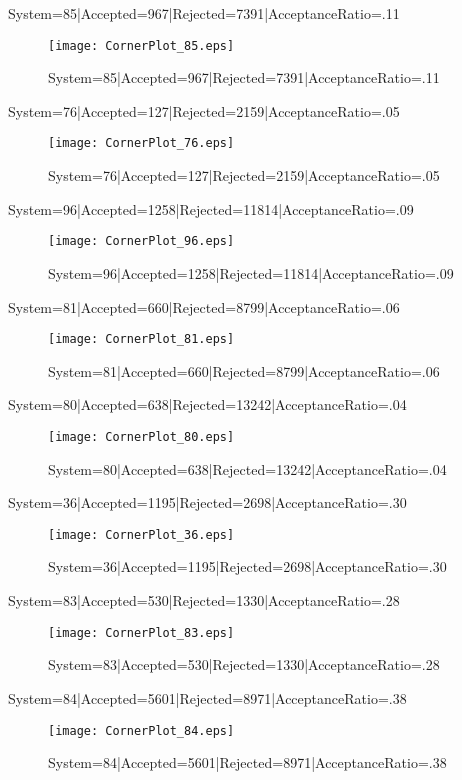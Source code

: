 \documentclass[10pt]{article}
\begin{document}
\listoffigures
System=85|Accepted=967|Rejected=7391|AcceptanceRatio=.11
\begin{figure}[h]
\texttt{[image: CornerPlot\_85.eps]}
\caption{System=85|Accepted=967|Rejected=7391|AcceptanceRatio=.11}
\label{S85}
\centering
\end{figure}

System=76|Accepted=127|Rejected=2159|AcceptanceRatio=.05
\begin{figure}[h]
\texttt{[image: CornerPlot\_76.eps]}
\caption{System=76|Accepted=127|Rejected=2159|AcceptanceRatio=.05}
\label{S76}
\centering
\end{figure}

System=96|Accepted=1258|Rejected=11814|AcceptanceRatio=.09
\begin{figure}[h]
\texttt{[image: CornerPlot\_96.eps]}
\caption{System=96|Accepted=1258|Rejected=11814|AcceptanceRatio=.09}
\label{S96}
\centering
\end{figure}

System=81|Accepted=660|Rejected=8799|AcceptanceRatio=.06
\begin{figure}[h]
\texttt{[image: CornerPlot\_81.eps]}
\caption{System=81|Accepted=660|Rejected=8799|AcceptanceRatio=.06}
\label{S81}
\centering
\end{figure}

System=80|Accepted=638|Rejected=13242|AcceptanceRatio=.04
\begin{figure}[h]
\texttt{[image: CornerPlot\_80.eps]}
\caption{System=80|Accepted=638|Rejected=13242|AcceptanceRatio=.04}
\label{S80}
\centering
\end{figure}

System=36|Accepted=1195|Rejected=2698|AcceptanceRatio=.30
\begin{figure}[h]
\texttt{[image: CornerPlot\_36.eps]}
\caption{System=36|Accepted=1195|Rejected=2698|AcceptanceRatio=.30}
\label{S36}
\centering
\end{figure}

System=83|Accepted=530|Rejected=1330|AcceptanceRatio=.28
\begin{figure}[h]
\texttt{[image: CornerPlot\_83.eps]}
\caption{System=83|Accepted=530|Rejected=1330|AcceptanceRatio=.28}
\label{S83}
\centering
\end{figure}

System=84|Accepted=5601|Rejected=8971|AcceptanceRatio=.38
\begin{figure}[h]
\texttt{[image: CornerPlot\_84.eps]}
\caption{System=84|Accepted=5601|Rejected=8971|AcceptanceRatio=.38}
\label{S84}
\centering
\end{figure}
\end{document}
